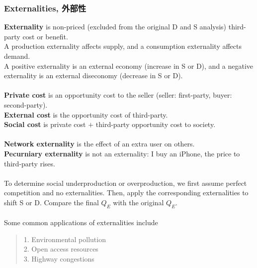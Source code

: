 \subsubsection{Externalities, 外部性}
\textbf{Externality} is non-priced (excluded from the original D and S analysis) third-party cost or benefit. \\
A production externality affects supply, and a consumption externality affects demand. \\
A positive externality is an external economy (increase in S or D), and a negative externality is an external diseconomy (decrease in S or D). \\
\\
\textbf{Private cost} is an opportunity cost to the seller (seller: first-party, buyer: second-party). \\
\textbf{External cost} is the opportunity cost of third-party. \\
\textbf{Social cost} is private cost $+$ third-party opportunity cost to society. \\
\\
\textbf{Network externality} is the effect of an extra user on others. \\
\textbf{Pecurniary externality} is not an externality: I buy an iPhone, the price to third-party rises. \\
\\
To determine social underproduction or overproduction, we first assume perfect competition and no externalities. Then, apply the corresponding externalities to shift S or D. Compare the final $Q_E$ with the original $Q_E$. \\
\\
Some common applications of externalities include
\begin{quote}
    1. Environmental pollution \\
    2. Open access resources \\
    3. Highway congestions
\end{quote}

